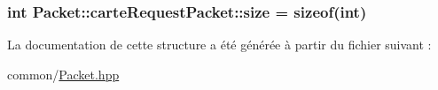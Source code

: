 \subsubsection[{size}]{\setlength{\rightskip}{0pt plus 5cm}int Packet\+::carte\+Request\+Packet\+::size = sizeof(int)}\label{structPacket_1_1carteRequestPacket_a9ceed268bd66ee87f7f7ce9735f7cac5}


La documentation de cette structure a été générée à partir du fichier suivant \+:\begin{DoxyCompactItemize}
\item 
common/\hyperlink{Packet_8hpp}{Packet.\+hpp}\end{DoxyCompactItemize}
